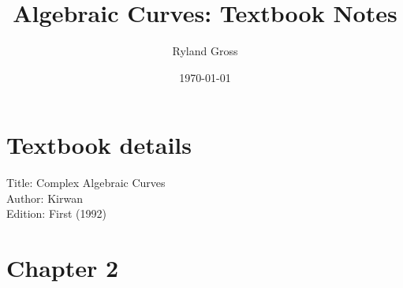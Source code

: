 \documentclass[11pt,a4paper,oneside]{book}
\title{Algebraic Curves: Textbook Notes}
\author{Ryland Gross}
\date{\today}
\theoremstyle{plain}
\theoremstyle{definition}
\theoremstyle{remark}
\begin{document}
\frontmatter
\maketitle

\chapter*{Textbook details}
\begin{description}
    \item[Title: Complex Algebraic Curves] %
    \item[Author: Kirwan] %
    \item[Edition: First (1992)] %
\end{description}

\mainmatter

\chapter*{Chapter 2}
\end{document}
